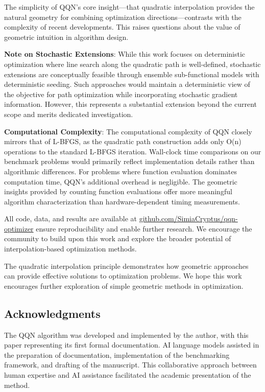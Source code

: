 The simplicity of QQN's core insight---that quadratic interpolation provides the natural geometry for combining
optimization directions---contrasts with the complexity of recent developments. This raises questions about the value of
geometric intuition in algorithm design.

\textbf{Note on Stochastic Extensions}: While this work focuses on deterministic optimization where line search along the
quadratic path is well-defined, stochastic extensions are conceptually feasible through ensemble sub-functional models
with deterministic seeding. Such approaches would maintain a deterministic view of the objective for path optimization
while incorporating stochastic gradient information. However, this represents a substantial extension beyond the current
scope and merits dedicated investigation.

\textbf{Computational Complexity}: The computational complexity of QQN closely mirrors that of L-BFGS, as the quadratic path
construction adds only O(n) operations to the standard L-BFGS iteration. Wall-clock time comparisons on our benchmark
problems would primarily reflect implementation details rather than algorithmic differences. For problems where function
evaluation dominates computation time, QQN's additional overhead is negligible. The geometric insights provided by
counting function evaluations offer more meaningful algorithm characterization than hardware-dependent timing
measurements.

All code, data, and results are available at \href{https://github.com/SimiaCryptus/qqn-optimizer/}{github.com/SimiaCryptus/qqn-optimizer}
ensure reproducibility and enable further research. We encourage the community to build upon this work and explore the
broader potential of interpolation-based optimization methods.

The quadratic interpolation principle demonstrates how geometric approaches can provide
effective solutions to optimization problems. We hope this work encourages further
exploration of simple geometric methods in optimization.

\hypertarget{acknowledgments}{%
\subsection{Acknowledgments}\label{acknowledgments}}

The QQN algorithm was developed and implemented by the author, with this paper representing its first formal
documentation. AI language models assisted in the preparation of documentation, implementation of the
benchmarking framework, and drafting of the manuscript. This collaborative approach between human expertise
and AI assistance facilitated the academic presentation of the method.


